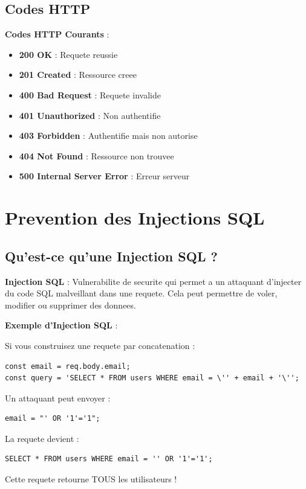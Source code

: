 \documentclass[a4paper,12pt]{book}
\begin{document}
\section{Codes HTTP}

\begin{definitionbox}
    \textbf{Codes HTTP Courants} :
    \begin{itemize}
        \item \textbf{200 OK} : Requete reussie
        \item \textbf{201 Created} : Ressource creee
        \item \textbf{400 Bad Request} : Requete invalide
        \item \textbf{401 Unauthorized} : Non authentifie
        \item \textbf{403 Forbidden} : Authentifie mais non autorise
        \item \textbf{404 Not Found} : Ressource non trouvee
        \item \textbf{500 Internal Server Error} : Erreur serveur
    \end{itemize}
\end{definitionbox}

\chapter{Prevention des Injections SQL}

\section{Qu'est-ce qu'une Injection SQL ?}

\begin{definitionbox}
    \textbf{Injection SQL} : Vulnerabilite de securite qui permet a un attaquant d'injecter du code SQL malveillant dans une requete. Cela peut permettre de voler, modifier ou supprimer des donnees.
\end{definitionbox}

\begin{errorbox}
    \textbf{Exemple d'Injection SQL} :

    Si vous construisez une requete par concatenation :
    \begin{lstlisting}[style=javascript]
const email = req.body.email;
const query = 'SELECT * FROM users WHERE email = \'' + email + '\'';
    \end{lstlisting}

    Un attaquant peut envoyer :
    \begin{lstlisting}[style=javascript]
email = "' OR '1'='1";
    \end{lstlisting}

    La requete devient :
    \begin{lstlisting}[style=sql]
SELECT * FROM users WHERE email = '' OR '1'='1';
    \end{lstlisting}

    Cette requete retourne TOUS les utilisateurs !
\end{errorbox}
\end{document}
